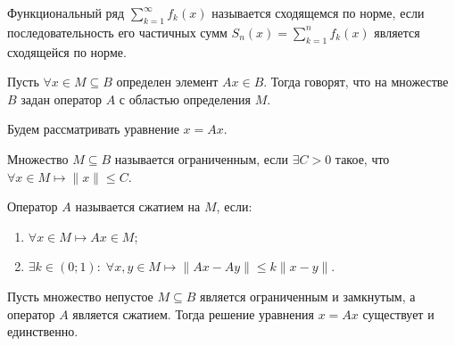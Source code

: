 	\begin{definition}
		Функциональный ряд $\displaystyle \sum\limits_{k = 1}^{\infty} f_k(x)$ называется сходящемся по норме, если последовательность его частичных сумм $\displaystyle S_n(x) = \sum\limits_{k = 1}^{n} f_k(x)$ является сходящейся по норме.
	\end{definition}

	\begin{definition}
		Пусть $\forall x \in M \subseteq B$ определен элемент $Ax \in B$. Тогда говорят, что на множестве $B$ задан оператор $A$ с областью определения $M$.
	\end{definition}

	Будем рассматривать уравнение $x = Ax$.
	
	\begin{definition}
		Множество $M \subseteq B$ называется ограниченным, если $\exists C > 0$ такое, что $\forall x \in M \longmapsto \|x\| \leqslant C$.
	\end{definition}

	\begin{definition}
		Оператор $A$ называется сжатием на $M$, если:
		\begin{enumerate}
			\item $\forall x \in M \longmapsto Ax \in M$;
			
			\item $\exists k \in (0; 1): \; \forall x, y \in M \longmapsto \|Ax - Ay\| \leqslant k\|x -y\|$.
		\end{enumerate}
	\end{definition}

	\begin{theorem}
		
		Пусть множество непустое $M \subseteq B$ является ограниченным и замкнутым, а оператор $A$ является сжатием. Тогда решение уравнения $x = Ax$ существует и единственно.
	\end{theorem}

